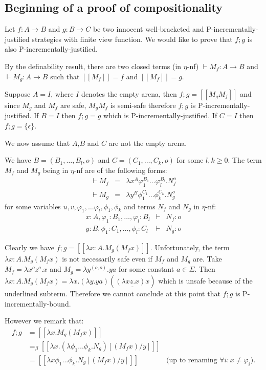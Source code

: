 \documentclass{article}
\newcommand{\sem}[1]{{[\![ #1 ]\!]}}
\theoremstyle{remark}
\theoremstyle{definition}
\begin{document}
\subsection{Beginning of a proof of compositionality}

Let $f:A\rightarrow B$ and $g:B\rightarrow C$ be two innocent well-bracketed and P-incrementally-justified strategies with finite view function.
We would like to prove that $f;g$ is also P-incrementally-justified.

By the definability result, there are two closed terms (in $\eta$-nf) $\vdash M_f :A\rightarrow B$  and $\vdash M_g :A\rightarrow B$ such that $\sem{M_f} = f$
and $\sem{M_f} = g$.

Suppose $A=I$, where $I$ denotes the empty arena, then $f;g = \sem{M_g M_f}$ and
since $M_g$ and $M_f$ are safe, $M_g M_f$ is semi-safe therefore $f;g$ is P-incrementally-justified.
If $B=I$ then $f;g = g$ which is P-incrementally-justified.
If $C=I$ then $f;g = \{ \epsilon \}$.

We now assume that $A$,$B$ and $C$ are not the empty arena.

We have $B=(B_1,\ldots,B_l,o)$ and $C=(C_1,\ldots,C_k,o)$ for some $l,k\geq 0$.
The term $M_f$ and $M_g$ being in $\eta$-nf are of the following forms:
\begin{eqnarray*}
\vdash M_f &=& \lambda x^A \varphi_1^{B_1} \ldots \varphi_l^{B_l} . N_f^o\\
\vdash  M_g &=& \lambda y^B \phi_1^{C_1} \ldots \phi_k^{C_k} . N_g^o
\end{eqnarray*}
for some variables $u,v,\varphi_1, \ldots \varphi_l, \phi_1, \phi_k$ and 
terms $N_f$ and $N_g$ in $\eta$-nf:
\begin{eqnarray*}
x:A, \varphi_1:B_1, \dots, \varphi_l:B_l &\vdash& N_f :o \\
y:B, \phi_1:C_1, \dots, \phi_l:C_l &\vdash& N_g :o
\end{eqnarray*}

Clearly we have $f;g = \sem{\lambda x:A . M_g (M_f x)}$.
Unfortunately, the term $\lambda x:A . M_g (M_f x)$ is not necessarily safe
even if $M_f$ and $M_g$ are. Take $M_f = \lambda x^o z^o.x$ and
$M_g = \lambda y^{(o,o)} . y a$ for some constant $a\in \Sigma$.
Then $\lambda x:A . M_g (M_f x) = \lambda x . (\lambda y . y a) ( \underline{(\lambda x z.x) x} )$ which is unsafe because of the underlined subterm. Therefore we cannot conclude at this point that $f;g$ is P-incrementally-bound.

However we remark that:
\begin{align*}
f;g &= \sem{\lambda x . M_g (M_f x)} \\
 &=_\beta \sem{\lambda x . (\lambda \phi_1\ldots \phi_k . N_g) [(M_f x) / y]} \\
&= \sem{\lambda x \phi_1 \dots \phi_k. N_g [(M_f x) / y]}
& \mbox{(up to renaming $\forall i: x\neq \varphi_i$)}.
\end{align*}
\end{document}

